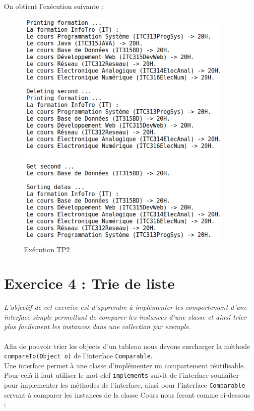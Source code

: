 On obtient l'exécution suivante :
\begin{figure}[H]
  \centering
  \includegraphics[width=300pt]{./tp/Pictures/tp2-execute}
  \caption{Exécution TP2}
  \label{Exécution TP2}
\end{figure}

\section{Exercice 4 : Trie de liste}
\textit{L'objectif de cet exercice est d'apprendre à implémenter les comportement d'une interface simple permettant de comparer les instances d'une classe et ainsi trier plus facilement les instances dans une collection par exemple.}
\\\\
Afin de pouvoir trier les objects d'un tableau nous devons surcharger la méthode \texttt{compareTo(Object o)} de l'interface \texttt{Comparable}.\\
Une interface permet à une classe d'implémenter un compartement réutilisable. Pour celà il faut utiliser le mot clef \texttt{implements} suivit de l'interface souhaiter pour implementer les méthodes de l'interface, ainsi pour l'interface \texttt{Comparable} servant à comparer les instances de la classe Cours nous feront comme ci-dessous :
\inputminted[linenos,firstline=3,lastline=3]{java}{../sources/src/tp2/Cours.java}

